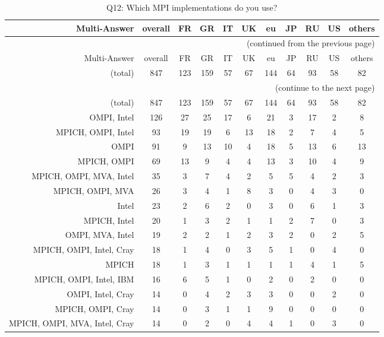 \clearpage%
{\footnotesize\begin{landscape}%
\begin{longtable}[htb]{r|c|c|c|c|c|c|c|c|c|c}%
\caption{Q12: Which MPI implementations do you use?}%
\label{tab:Q12-mans} \\%
\hline%
Multi-Answer & overall & FR & GR & IT & UK & eu & JP & RU & US & others \\
 \hline%
\endfirsthead%
\multicolumn{11}{r}{(continued from the previous page)}\\%
\hline%
Multi-Answer & overall & FR & GR & IT & UK & eu & JP & RU & US & others \\
 \hline%
\endhead%
\hline%
(total) & 847 & 123 & 159 & 57 & 67 & 144 & 64 & 93 & 58 & 82 \\%
\hline%
\multicolumn{11}{r}{(continue to the next page)}\\%
\endfoot%
\hline%
(total) & 847 & 123 & 159 & 57 & 67 & 144 & 64 & 93 & 58 & 82 \\%
\hline%
\endlastfoot%
\hline%
{OMPI, Intel} & 126 & 27 & 25 & 17 & 6 & 21 & 3 & 17 & 2 & 8 \\%
{MPICH, OMPI, Intel} & 93 & 19 & 19 & 6 & 13 & 18 & 2 & 7 & 4 & 5 \\%
{OMPI} & 91 & 9 & 13 & 10 & 4 & 18 & 5 & 13 & 6 & 13 \\%
{MPICH, OMPI} & 69 & 13 & 9 & 4 & 4 & 13 & 3 & 10 & 4 & 9 \\%
{MPICH, OMPI, MVA, Intel} & 35 & 3 & 7 & 4 & 2 & 5 & 5 & 4 & 2 & 3 \\%
{MPICH, OMPI, MVA} & 26 & 3 & 4 & 1 & 8 & 3 & 0 & 4 & 3 & 0 \\%
{Intel} & 23 & 2 & 6 & 2 & 0 & 3 & 0 & 6 & 1 & 3 \\%
{MPICH, Intel} & 20 & 1 & 3 & 2 & 1 & 1 & 2 & 7 & 0 & 3 \\%
{OMPI, MVA, Intel} & 19 & 2 & 2 & 1 & 2 & 3 & 2 & 0 & 2 & 5 \\%
{MPICH, OMPI, Intel, Cray} & 18 & 1 & 4 & 0 & 3 & 5 & 1 & 0 & 4 & 0 \\%
{MPICH} & 18 & 1 & 3 & 1 & 1 & 1 & 1 & 4 & 1 & 5 \\%
{MPICH, OMPI, Intel, IBM} & 16 & 6 & 5 & 1 & 0 & 2 & 0 & 2 & 0 & 0 \\%
{OMPI, Intel, Cray} & 14 & 0 & 4 & 2 & 3 & 3 & 0 & 0 & 2 & 0 \\%
{MPICH, OMPI, Cray} & 14 & 0 & 3 & 1 & 1 & 9 & 0 & 0 & 0 & 0 \\%
{MPICH, OMPI, MVA, Intel, Cray} & 14 & 0 & 2 & 0 & 4 & 4 & 1 & 0 & 3 & 0 \\%

\end{longtable}
\end{landscape}}
